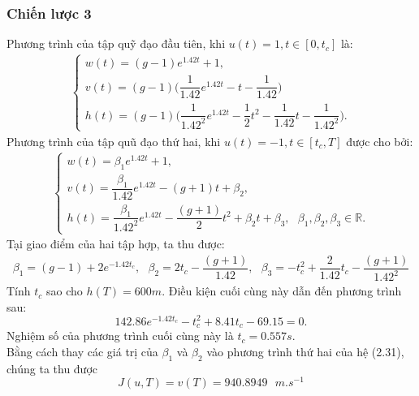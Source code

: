\documentclass[12pt,a4paper]{report}
\begin{document}
\subsubsection{Chiến lược 3}
Phương trình của tập quỹ đạo đầu tiên, khi $u(t) = 1, t \in [0, t_c]$ là: 
\begin{eqnarray}
	\begin{cases}
		w(t) = (g-1)e^{1.42t}+1, \\ v(t) = (g-1)\bigg(\dfrac{1}{1.42}e^{1.42t}-t-\dfrac{1}{1.42}\bigg) \\ h(t) = (g-1)\bigg(\dfrac{1}{1.42^2}e^{1.42t}-\dfrac{1}{2}t^2-\dfrac{1}{1.42}t - \dfrac{1}{1.42^2}\bigg).
	\end{cases}
\end{eqnarray}
Phương trình của tập quũ đạo thứ hai, khi $u(t) = -1, t\in [t_c, T]$ được cho bởi: 
\begin{eqnarray}
	\begin{cases}
		w(t) = \beta_1 e^{1.42t} + 1, \\ v(t) = \dfrac{\beta_1}{1.42}e^{1.42t} - (g+1)t+\beta_2, \\ h(t) = \dfrac{\beta_1}{1.42^2}e^{1.42t} - \dfrac{(g+1)}{2}t^2 + \beta_2t + \beta_3, \text{ }  \beta_1, \beta_2, \beta_3 \in \mathbb{R}.
	\end{cases}
\end{eqnarray}
Tại giao điểm của hai tập hợp, ta thu được: \begin{eqnarray}
	\beta_1 = (g-1) + 2e^{-1.42t_c}, \text{ } \beta_2 = 2t_c - \dfrac{(g+1)}{1.42}, \text{ } \beta_3 = -t_c^2 + \dfrac{2}{1.42}t_c - \dfrac{(g+1)}{1.42^2} \nonumber
\end{eqnarray}
Tính $t_c$ sao cho $h(T) = 600m$. Điều kiện cuối cùng này dẫn đến phương trình sau: \begin{equation}
	142.86e^{-1.42t_c} - t_c^2 + 8.41t_c - 69.15 = 0.
\end{equation}
Nghiệm số của phương trình cuối cùng này là $t_c = 0.557s.$ \\ Bằng cách thay các giá trị của $\beta_1$ và $\beta_2$ vào phương trình thứ hai của hệ (2.31), chúng ta thu được $$J(u, T) = v(T) = 940.8949\text{ }m.s^{-1}$$
\end{document}
